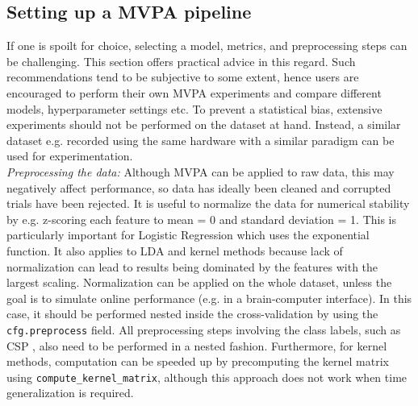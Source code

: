 \documentclass[utf8]{frontiersSCNS} %
\newcommand{\ttt}[1]{\texttt{#1}}
\begin{document}

\subsection{Setting up a MVPA pipeline}

If one is spoilt for choice, selecting  a model, metrics, and preprocessing steps can be challenging. This section offers practical advice in this regard. Such recommendations tend to be subjective to some extent, hence users are encouraged to perform their own MVPA experiments and compare different models, hyperparameter settings etc. To prevent a statistical bias, extensive experiments should not be performed on the dataset at hand. Instead, a similar dataset e.g. recorded using the same hardware with a similar paradigm can be used for experimentation.\\

\textit{Preprocessing the data:} Although MVPA can be applied to raw data, this may negatively affect performance, so data has ideally been cleaned and corrupted trials have been rejected. It is useful to normalize the data for numerical stability by e.g. z-scoring each feature to mean = 0 and standard deviation = 1. This is particularly important for Logistic Regression which uses the exponential function. It also applies to LDA and kernel methods because lack of normalization can lead to results being dominated by the features with the largest scaling.  Normalization can be applied on the whole dataset, unless the goal is to simulate online performance (e.g. in a brain-computer interface). In this case, it should be performed nested inside the  cross-validation by using the \ttt{cfg.preprocess} field. All preprocessing steps involving the class labels, such as CSP \citep{Blankertz2008a}, also need to be performed in a nested fashion. Furthermore, for kernel methods, computation can be speeded up by precomputing the kernel matrix using \ttt{compute\_kernel\_matrix}, although this approach does not work when time generalization is required.
\end{document}
